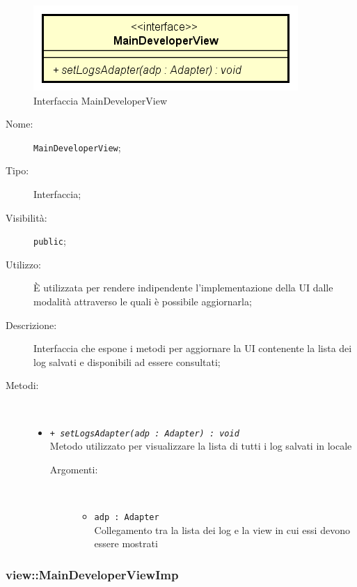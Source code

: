 \documentclass[../DefinizioneDiProdotto.tex]{subfiles}
\begin{document}
    \begin{figure}[H]
        \centering
        \includegraphics{img/MainDeveloperView.png}
        \caption{Interfaccia MainDeveloperView}\label{fig:view::MainDeveloperView} 
    \end{figure}
    \begin{description}
\item[Nome:] \texttt{MainDeveloperView};
\item[Tipo:] Interfaccia;
\item[Visibilità:] \texttt{public};
\item[Utilizzo:] È utilizzata per rendere indipendente l'implementazione della UI dalle modalità attraverso le quali è possibile aggiornarla;
\item[Descrizione:] Interfaccia che espone i metodi per aggiornare la UI contenente la lista dei log salvati e disponibili ad essere consultati;
\item[Metodi:] \
\begin{itemize}
\item \texttt{+ \textit{setLogsAdapter(adp : Adapter) : void}}\\
Metodo utilizzato per visualizzare la lista di tutti i log salvati in locale
 \begin{description}
\item[Argomenti:] \
\begin{itemize}
\item \texttt{adp : Adapter}\\
Collegamento tra la lista dei log e la view in cui essi devono essere mostrati\end{itemize}
\end{description}
\end{itemize}
\end{description}

\subsubsection{view::MainDeveloperViewImp}
\end{document}
